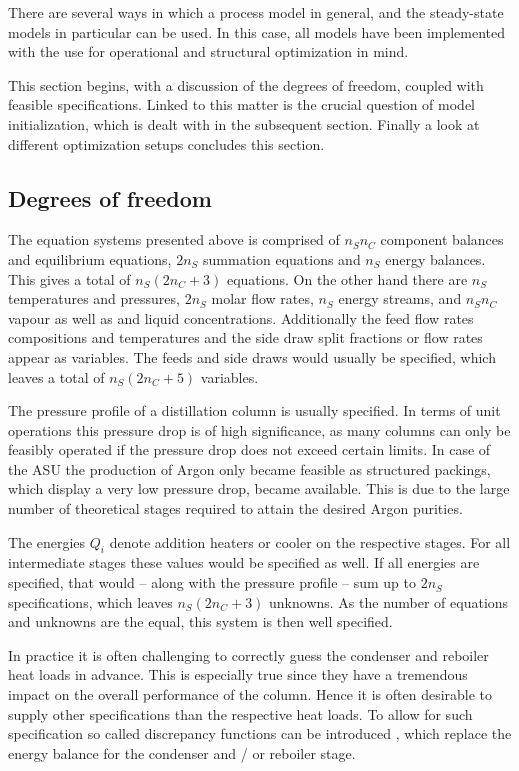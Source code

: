     There are several ways in which a process model in general, and the steady-state models in particular can be used. 
    In this case, all models have been implemented with the use for operational and structural optimization 
    in mind. 
    
    This section begins, with a discussion of the degrees of freedom, coupled with feasible specifications. 
    Linked to this matter is the crucial question of model initialization, which is dealt with in the 
    subsequent section. Finally a look at different optimization setups concludes this section. 


    \subsection{Degrees of freedom}
        The equation systems presented above is comprised of $n_S n_C$ component balances and equilibrium
        equations, $2n_S$ summation equations and $n_S$ energy balances. This gives a total of $n_S (2n_C + 3)$
        equations. On the other hand there are $n_S$ temperatures and pressures, $2n_S$ molar flow rates,
        $n_S$ energy streams, and $n_S n_C$ vapour as well as and liquid concentrations. Additionally the feed flow rates
        compositions and temperatures and the side draw split fractions or flow rates appear as variables. The
        feeds and side draws would usually be specified, which leaves a total of $n_S (2n_C + 5)$ variables.

        The pressure profile of a distillation column is usually specified.
        In terms of unit operations this pressure drop is of high significance,
        as many columns can only be feasibly operated if the pressure drop does not exceed certain
        limits. In case of the ASU the production of Argon only became feasible as structured
        packings, which display a very low pressure drop, became available. This is due to the large
        number of theoretical stages required to attain the desired Argon purities.

        The energies $Q_i$ denote addition heaters or cooler on the respective stages. For all
        intermediate stages these values would be specified as well. If all energies are
        specified, that would -- along with the pressure profile -- sum up to $2 n_S$ specifications,
        which leaves $n_S (2n_C + 3)$ unknowns. As the number of equations and unknowns are the equal,
        this system is then well specified.

        In practice it is often challenging to correctly guess the condenser and reboiler heat loads in
        advance. This is especially true since they have a tremendous impact on the overall performance
        of the column. Hence it is often desirable to supply other specifications than the respective
        heat loads. To allow for such specification so called discrepancy functions can be introduced
        \cite{Henley.op.2011}, which replace the energy balance for the condenser and / or reboiler stage.

